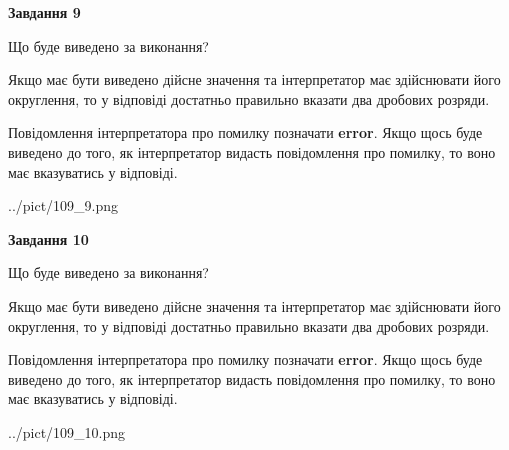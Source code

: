 \documentclass[12pt, ukrainian]{article}
\begin{document}
{\begin {Large}
{\begin {center}\textbf{Завдання 9}\end {center}}\par
Що буде виведено за виконання? \par

Якщо має бути виведено дійсне значення та інтерпретатор має здійснювати його округлення, 
то у відповіді достатньо правильно вказати два дробових розряди.

Повідомлення інтерпретатора про помилку позначати \textbf{error}.
Якщо щось буде виведено до того, як інтерпретатор видасть повідомлення про помилку, 
то воно має вказуватись у відповіді. \par

\begin{center}
	{../pict/109_9.png}
\end{center}
\newpage

{\begin {center}\textbf{Завдання 10}\end {center}}\par
Що буде виведено за виконання? \par

Якщо має бути виведено дійсне значення та інтерпретатор має здійснювати його округлення, 
то у відповіді достатньо правильно вказати два дробових розряди.

Повідомлення інтерпретатора про помилку позначати \textbf{error}.
Якщо щось буде виведено до того, як інтерпретатор видасть повідомлення про помилку, 
то воно має вказуватись у відповіді. \par

\begin{center}
	{../pict/109_10.png}
\end{center}
\newpage

\end {Large}}
\end{document}

